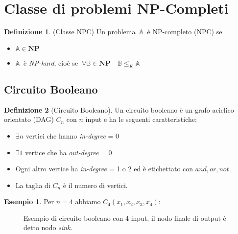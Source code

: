 \documentclass[a4paper]{article}
\theoremstyle{definition}
\newtheorem{esempio}{Esempio}[subsection]
\newtheorem{definit}{Definizione}[subsection]
\newcommand{\np}{\mathbf{NP}}
\newcommand{\prob}[1]{\mathbb{#1}}
\begin{document}
	\section{Classe di problemi NP-Completi}
		\begin{definit}(Classe NPC)
			Un problema $\ \prob{A}\ $ è NP-completo (NPC) se
			\begin{itemize}
				\item $ \prob{A} \in \np $
				\item $ \prob{A}\ $ è \textit{NP-hard}, cioè se $ \ \forall \prob{B} \in \np \quad \prob{B}\leq_K \prob{A} $
			\end{itemize}
		\end{definit}
		
	\subsection{Circuito Booleano}
		\begin{definit}[Circuito Booleano]
			Un circuito booleano è un grafo aciclico orientato (DAG) $ C_n $ con $ n $ input e ha le seguenti caratteristiche:
			\begin{itemize}
				\item $ \exists n $ vertici che hanno \textit{in-degree} = 0
				\item $ \exists 1 $ vertice che ha \textit{out-degree} = 0
				\item Ogni altro vertice ha \textit{in-degree} = 1 o 2 ed è etichettato con $ and, or, not $.
				\item La taglia di $ C_n $ è il numero di vertici.
			\end{itemize}
		\end{definit}
		
		\begin{esempio}
			Per $ n = 4 $ abbiamo $ C_4(x_1, x_2, x_3, x_4) $:
			\begin{figure}[h!]
				\centering
				\caption{Esempio di circuito booleano con 4 input, il nodo finale di output è detto nodo \textit{sink}.}
			\end{figure}
		\end{esempio}
		
\end{document}
